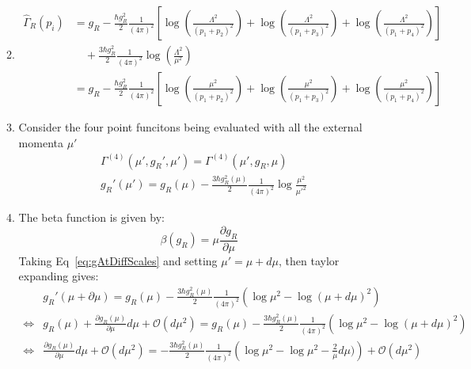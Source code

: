 \documentclass[12pt,a4]{article}
\begin{document}
\begin{enumerate}
\begin{enumerate}
\begin{equation*}
        \end{equation*}
      \item
        \begin{align*}
          \hat \Gamma_R(p_i)  &= g_R -\frac{\hbar g_R^2}{2} \frac{1}{(4 \pi)^2}\left[\log\left(\frac{\Lambda^2}{(p_1 + p_2)^2}\right) + \log\left(\frac{\Lambda^2}{(p_1 + p_3)^2}\right) + \log\left(\frac{\Lambda^2}{(p_1 + p_4)^2}\right)\right]\\ 
                              &\quad +  \frac{3\hbar g_R^2}{2}\frac{1}{(4 \pi)^2} \log\left(\frac{\Lambda^2}{\mu^2}\right)\\
                              &=g_R - \frac{\hbar g_R^2}{2} \frac{1}{(4 \pi)^2}\left[\log\left(\frac{\mu^2}{(p_1 + p_2)^2}\right) + \log\left(\frac{\mu^2}{(p_1 + p_3)^2}\right) + \log\left(\frac{\mu^2}{(p_1 + p_4)^2}\right)\right]
        \end{align*}
      \item
        Consider the four point funcitons being evaluated with all the external momenta $\mu '$
        \begin{align}
          &\Gamma^{(4)}(\mu', g_R', \mu') = \Gamma^{(4)}(\mu', g_R, \mu)\nonumber \\
          &g_R'(\mu ') = g_R(\mu) - \frac{3\hbar g_R^2(\mu)}{2}\frac{1}{(4 \pi)^2}\log\frac{\mu^2}{\mu'^2} \label{eq:gAtDiffScales}
        \end{align}
      \item
        The beta function is given by:
        \begin{equation*}
          \beta(g_R) = \mu \frac{\partial g_R}{\partial\mu}
        \end{equation*}
        Taking Eq~\ref{eq:gAtDiffScales} and setting $\mu '  = \mu + d\mu$, then taylor expanding gives:
        \begin{align*}
                          & g_R'(\mu + \partial\mu) = g_R(\mu) - \frac{3\hbar g_R^2(\mu)}{2}\frac{1}{(4 \pi)^2}\left(\log \mu^2  - \log (\mu + d\mu)^2\right)\\
          \Leftrightarrow & g_R(\mu) + \frac{\partial g_R(\mu)}{\partial\mu} d\mu + \mathcal{O}(d\mu^2) = g_R(\mu) - \frac{3\hbar g_R^2(\mu)}{2}\frac{1}{(4 \pi)^2}\left(\log \mu^2 - \log (\mu + d\mu)^2\right)\\
          \Leftrightarrow & \frac{\partial g_R(\mu)}{\partial\mu}d \mu + \mathcal{O}(d\mu^2) = - \frac{3\hbar g_R^2(\mu)}{2}\frac{1}{(4 \pi)^2}\left(\log \mu^2 - \log \mu^2  - \frac{2}{\mu} d\mu)\right) +\mathcal{O}(d\mu^2)\\

\end{align*}
\end{enumerate}
\end{enumerate}
\end{document}
